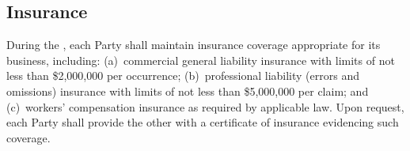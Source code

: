 \subsection{Insurance}
During the , each Party shall maintain insurance coverage appropriate for its business, including: (a)~commercial general liability insurance with limits of not less than \$2,000,000 per occurrence; (b)~professional liability (errors and omissions) insurance with limits of not less than \$5,000,000 per claim; and (c)~workers' compensation insurance as required by applicable law. Upon request, each Party shall provide the other with a certificate of insurance evidencing such coverage.

